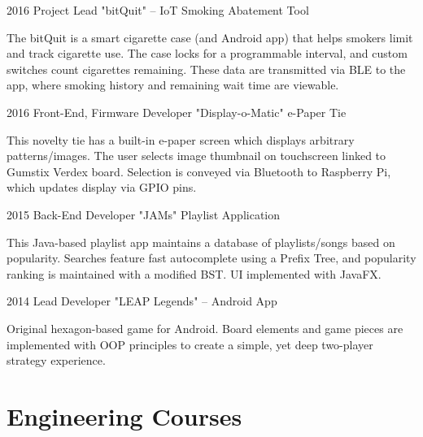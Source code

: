 \documentclass{tccv_AH}
\begin{document}
\begin{eventlist}

\item{2016}
     {Project Lead}
     {"bitQuit" -- IoT Smoking Abatement Tool}

The bitQuit is a smart cigarette case (and Android app) that helps smokers limit and track cigarette use. The case locks for a programmable interval, and custom switches count cigarettes remaining. These data are transmitted via BLE to the app, where smoking history and remaining wait time are viewable.

\item{2016}
     {Front-End, Firmware Developer}
     {"Display-o-Matic" e-Paper Tie}
     
This novelty tie has a built-in e-paper screen which displays arbitrary patterns/images. The user selects image thumbnail on touchscreen linked to Gumstix Verdex board. Selection is conveyed via Bluetooth to Raspberry Pi, which updates display via GPIO pins.

\item{2015}
     {Back-End Developer}
     {"JAMs" Playlist Application}

This Java-based playlist app maintains a database of playlists/songs based on popularity. Searches feature fast autocomplete using a Prefix Tree, and popularity ranking is maintained with a modified BST. UI implemented with JavaFX.


\item{2014}
     {Lead Developer}
     {"LEAP Legends" -- Android App}

Original hexagon-based game for Android. Board elements and game pieces are implemented with OOP principles to create a simple, yet deep two-player strategy experience. 

\end{eventlist}

\section{Engineering Courses}
\end{document}
